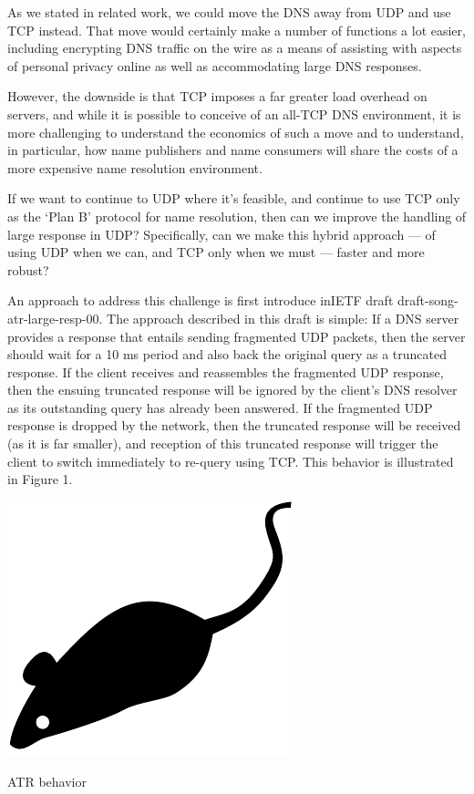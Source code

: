 As we stated in related work, we could move the DNS away from UDP and use TCP instead. That move would certainly make a number of functions a lot easier, including encrypting DNS traffic on the wire as a means of assisting with aspects of personal privacy online as well as accommodating large DNS responses.

However, the downside is that TCP imposes a far greater load overhead on servers, and while it is possible to conceive of an all-TCP DNS environment, it is more challenging to understand the economics of such a move and to understand, in particular, how name publishers and name consumers will share the costs of a more expensive name resolution environment.

If we want to continue to UDP where it’s feasible, and continue to use TCP only as the ‘Plan B’ protocol for name resolution, then can we improve the handling of large response in UDP? Specifically, can we make this hybrid approach — of using UDP when we can, and TCP only when we must — faster and more robust?

An approach to address this challenge is first introduce inIETF draft draft-song-atr-large-resp-00. The approach described in this draft is simple: If a DNS server provides a response that entails sending fragmented UDP packets, then the server should wait for a 10 ms period and also back the original query as a truncated response. If the client receives and reassembles the fragmented UDP response, then the ensuing truncated response will be ignored by the client’s DNS resolver as its outstanding query has already been answered. If the fragmented UDP response is dropped by the network, then the truncated response will be received (as it is far smaller), and reception of this truncated response will trigger the client to switch immediately to re-query using TCP. This behavior is illustrated in Figure 1.

\centering
\includegraphics{figures/mouse}
\caption{ATR behavior}


